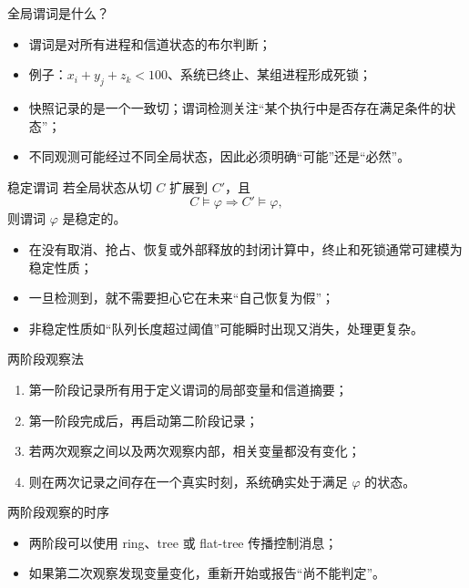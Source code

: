 \documentclass[UTF8,fontset=none,aspectratio=169,10pt]{beamer}
\begin{document}
\begin{frame}{全局谓词是什么？}
\begin{itemize}
  \item 谓词是对所有进程和信道状态的布尔判断；
  \item 例子：$x_i+y_j+z_k<100$、系统已终止、某组进程形成死锁；
  \item 快照记录的是一个一致切；谓词检测关注“某个执行中是否存在满足条件的状态”；
  \item 不同观测可能经过不同全局状态，因此必须明确“可能”还是“必然”。
\end{itemize}
\end{frame}

\begin{frame}{稳定谓词}
若全局状态从切 $C$ 扩展到 $C'$，且
\[
C\models\varphi\Longrightarrow C'\models\varphi,
\]
则谓词 $\varphi$ 是稳定的。
\begin{itemize}
  \item 在没有取消、抢占、恢复或外部释放的封闭计算中，终止和死锁通常可建模为稳定性质；
  \item 一旦检测到，就不需要担心它在未来“自己恢复为假”；
  \item 非稳定性质如“队列长度超过阈值”可能瞬时出现又消失，处理更复杂。
\end{itemize}
\end{frame}

\begin{frame}{两阶段观察法}
\begin{enumerate}
  \item 第一阶段记录所有用于定义谓词的局部变量和信道摘要；
  \item 第一阶段完成后，再启动第二阶段记录；
  \item 若两次观察之间以及两次观察内部，相关变量都没有变化；
  \item 则在两次记录之间存在一个真实时刻，系统确实处于满足 $\varphi$ 的状态。
\end{enumerate}
\vfill
{}
\end{frame}

\begin{frame}{两阶段观察的时序}
\begin{center}
\end{center}
\begin{itemize}
  \item 两阶段可以使用 ring、tree 或 flat-tree 传播控制消息；
  \item 如果第二次观察发现变量变化，重新开始或报告“尚不能判定”。
\end{itemize}
\end{frame}
\end{document}
